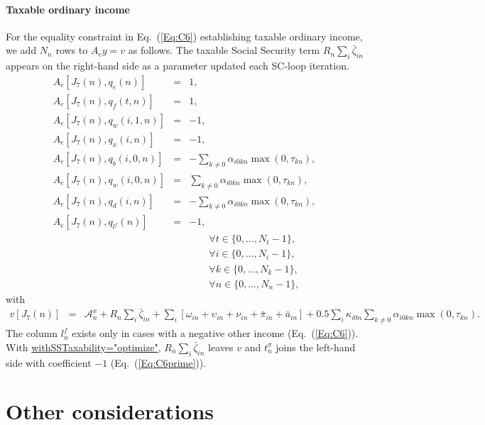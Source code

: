\documentclass[fleqn,12pt]{report}
\newcommand{\code}[1]{\url{#1}}
\begin{document}
\paragraph*{Taxable ordinary income}
For the equality constraint in Eq.~(\ref{Eq:C6}) establishing taxable
ordinary income, we add $N_n$ rows to $A_ey = v$ as follows.
The taxable Social Security term $R_n\sum_i\bar{\zeta}_{in}$ appears on
the right-hand side as a parameter updated each SC-loop iteration.
\begin{eqnarray}
	A_e[J_7(n), q_e(n)] &=& 1, \nonumber \\
	A_e[J_7(n), q_{f}(t, n)] &=& 1, \nonumber \\
	A_e[J_7(n), q_w(i, 1, n)] &=& -1, \nonumber \\
	A_e[J_7(n), q_x(i, n)] &=& -1, \nonumber \\
	A_e[J_7(n), q_b(i, 0, n)] &=& -\sum_{k\neq 0} \alpha_{i0kn}\max(0, \tau_{kn}), \\
	A_e[J_7(n), q_w(i, 0, n)] &=&  \sum_{k\neq 0} \alpha_{i0kn}\max(0, \tau_{kn}), \nonumber \\
	A_e[J_7(n), q_d(i, n)] &=&    -\sum_{k\neq 0} \alpha_{i0kn}\max(0, \tau_{kn}), \nonumber \\
	A_e[J_7(n), q_{l^f}(n)] &=&    -1, \nonumber \\
	&&\qquad\forall t \in \{0,\ldots, N_t-1\},\nonumber\\
	&&\qquad\forall i \in \{0,\ldots, N_i-1\},\nonumber\\
	&&\qquad\forall k \in \{0,\ldots, N_k-1\},\nonumber\\
	&&\qquad\forall n \in \{0,\ldots, N_n-1\}, \nonumber
\end{eqnarray}
with
\begin{eqnarray}
	v[J_7(n)] &=&
	\mathcal{A}^x_n + R_n\sum_i\bar{\zeta}_{in} + \sum_i [\omega_{in} + \upsilon_{in} + \nu_{in} + \bar{\pi}_{in} + \bar{a}_{in}]
	+ 0.5\sum_{i} \kappa_{i0n} \sum_{k\neq 0} \alpha_{i0kn}\max(0, \tau_{kn}).
\end{eqnarray}
The column $l^f_n$ exists only in cases with a negative other income (Eq.~(\ref{Eq:C6})).
With \code{withSSTaxability="optimize"}, $R_n\sum_i\bar{\zeta}_{in}$ leaves $v$ and
$t^\sigma_n$ joins the left-hand side with coefficient $-1$ (Eq.~(\ref{Eq:C6prime})).

\section{Other considerations}
\end{document}
